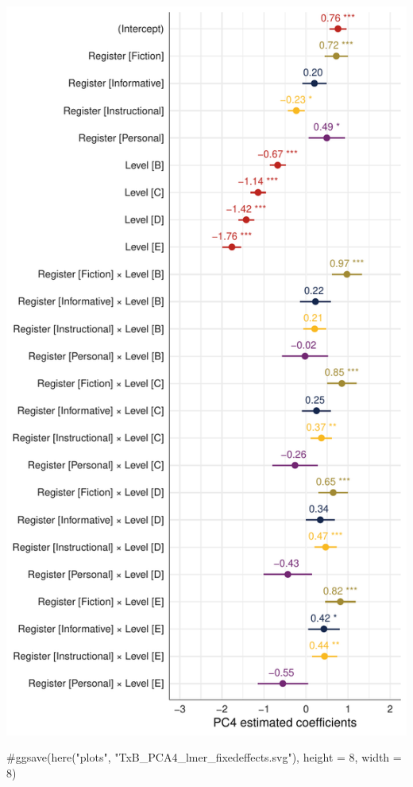 \documentclass[
  letterpaper,
  DIV=11,
  numbers=noendperiod]{scrreprt}
\newenvironment{Shaded}{\begin{snugshade}}{\end{snugshade}}
\newcommand{\CommentTok}[1]{\textcolor[rgb]{0.37,0.37,0.37}{#1}}
\begin{document}
\includegraphics{AppendixF_files/figure-pdf/Dim4model-1.pdf}

\begin{Shaded}
\begin{Highlighting}[]
\CommentTok{\#ggsave(here("plots", "TxB\_PCA4\_lmer\_fixedeffects.svg"), height = 8, width = 8)}
\end{Highlighting}
\end{Shaded}
\end{document}

